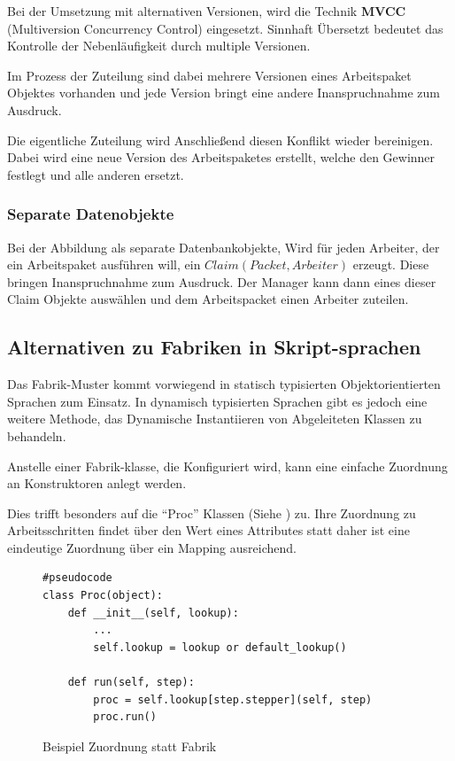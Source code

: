 Bei der Umsetzung mit alternativen Versionen, wird die Technik \textbf{MVCC} (Multiversion Concurrency Control) eingesetzt.
Sinnhaft Übersetzt bedeutet das Kontrolle der Nebenläufigkeit durch multiple Versionen.

Im Prozess der Zuteilung sind dabei mehrere Versionen eines Arbeitspaket Objektes vorhanden und jede Version bringt eine andere Inanspruchnahme zum Ausdruck.

Die eigentliche Zuteilung wird Anschließend diesen Konflikt wieder bereinigen.
Dabei wird eine neue Version des Arbeitspaketes erstellt, welche den Gewinner festlegt und alle anderen ersetzt.

\subsubsection{Separate Datenobjekte}

Bei der Abbildung als separate Datenbankobjekte,
Wird für jeden Arbeiter, der ein Arbeitspaket ausführen will, ein $Claim(Packet, Arbeiter)$ erzeugt. Diese bringen Inanspruchnahme zum Ausdruck.
Der Manager kann dann eines dieser Claim Objekte auswählen und dem Arbeitspacket einen Arbeiter zuteilen.


\subsection{Alternativen zu Fabriken in Skript-sprachen}

Das Fabrik-Muster kommt vorwiegend in statisch typisierten Objektorientierten Sprachen zum Einsatz. In dynamisch typisierten Sprachen gibt es jedoch eine weitere Methode, das Dynamische Instantiieren von Abgeleiteten Klassen zu behandeln.

Anstelle einer Fabrik-klasse, die Konfiguriert wird,
kann eine einfache Zuordnung an Konstruktoren anlegt werden.

Dies trifft besonders auf die ``Proc'' Klassen (Siehe ) zu.
Ihre Zuordnung zu Arbeitsschritten findet über den Wert eines Attributes statt
daher ist eine eindeutige Zuordnung über ein Mapping ausreichend.

\begin{figure}
\begin{verbatim}
#pseudocode
class Proc(object):
    def __init__(self, lookup):
        ...
        self.lookup = lookup or default_lookup()

    def run(self, step):
        proc = self.lookup[step.stepper](self, step)
        proc.run()
\end{verbatim}
\caption{Beispiel Zuordnung statt Fabrik}
\end{figure}